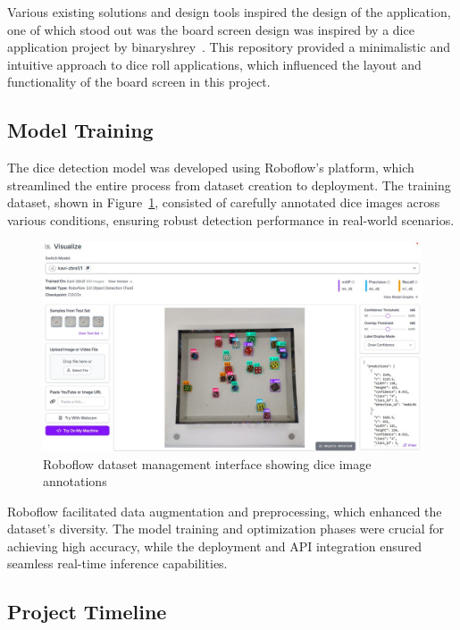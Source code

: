 Various existing solutions and design tools inspired the design of the application, one of which stood out was the board screen design was inspired by a dice application project by binaryshrey~\cite{bib:binaryshrey}. This repository provided a minimalistic and intuitive approach to dice roll applications, which influenced the layout and functionality of the board screen in this project.

\subsection{Model Training}

The dice detection model was developed using Roboflow's platform, which streamlined the entire process from dataset creation to deployment. The training dataset, shown in Figure~\ref{fig:roboflow_dataset}, consisted of carefully annotated dice images across various conditions, ensuring robust detection performance in real-world scenarios.

\begin{figure}[ht!]
    \centering
    \includegraphics[width=\textwidth]{img/roboflow_dataset.jpg}
    \caption{Roboflow dataset management interface showing dice image annotations}
    \label{fig:roboflow_dataset}
\end{figure}

Roboflow facilitated data augmentation and preprocessing, which enhanced the dataset's diversity. The model training and optimization phases were crucial for achieving high accuracy, while the deployment and API integration ensured seamless real-time inference capabilities.

\subsection{Project Timeline}

